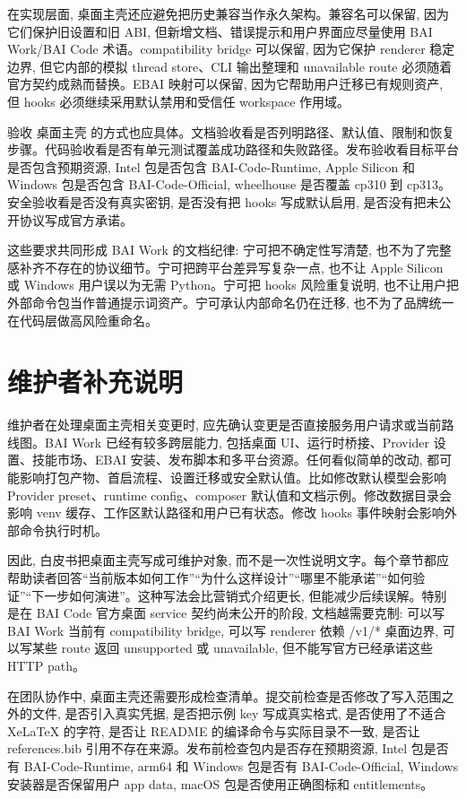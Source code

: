 在实现层面, 桌面主壳还应避免把历史兼容当作永久架构。兼容名可以保留, 因为它们保护旧设置和旧 ABI, 但新增文档、错误提示和用户界面应尽量使用 BAI Work/BAI Code 术语。compatibility bridge 可以保留, 因为它保护 renderer 稳定边界, 但它内部的模拟 thread store、CLI 输出整理和 unavailable route 必须随着官方契约成熟而替换。EBAI 映射可以保留, 因为它帮助用户迁移已有规则资产, 但 hooks 必须继续采用默认禁用和受信任 workspace 作用域。

验收 桌面主壳 的方式也应具体。文档验收看是否列明路径、默认值、限制和恢复步骤。代码验收看是否有单元测试覆盖成功路径和失败路径。发布验收看目标平台是否包含预期资源, Intel 包是否包含 BAI-Code-Runtime, Apple Silicon 和 Windows 包是否包含 BAI-Code-Official, wheelhouse 是否覆盖 cp310 到 cp313。安全验收看是否没有真实密钥, 是否没有把 hooks 写成默认启用, 是否没有把未公开协议写成官方承诺。

这些要求共同形成 BAI Work 的文档纪律: 宁可把不确定性写清楚, 也不为了完整感补齐不存在的协议细节。宁可把跨平台差异写复杂一点, 也不让 Apple Silicon 或 Windows 用户误以为无需 Python。宁可把 hooks 风险重复说明, 也不让用户把外部命令包当作普通提示词资产。宁可承认内部命名仍在迁移, 也不为了品牌统一在代码层做高风险重命名。

\section{维护者补充说明}

维护者在处理桌面主壳相关变更时, 应先确认变更是否直接服务用户请求或当前路线图。BAI Work 已经有较多跨层能力, 包括桌面 UI、运行时桥接、Provider 设置、技能市场、EBAI 安装、发布脚本和多平台资源。任何看似简单的改动, 都可能影响打包产物、首启流程、设置迁移或安全默认值。比如修改默认模型会影响 Provider preset、runtime config、composer 默认值和文档示例。修改数据目录会影响 venv 缓存、工作区默认路径和用户已有状态。修改 hooks 事件映射会影响外部命令执行时机。

因此, 白皮书把桌面主壳写成可维护对象, 而不是一次性说明文字。每个章节都应帮助读者回答“当前版本如何工作”“为什么这样设计”“哪里不能承诺”“如何验证”“下一步如何演进”。这种写法会比营销式介绍更长, 但能减少后续误解。特别是在 BAI Code 官方桌面 service 契约尚未公开的阶段, 文档越需要克制: 可以写 BAI Work 当前有 compatibility bridge, 可以写 renderer 依赖 /v1/* 桌面边界, 可以写某些 route 返回 unsupported 或 unavailable, 但不能写官方已经承诺这些 HTTP path。

在团队协作中, 桌面主壳还需要形成检查清单。提交前检查是否修改了写入范围之外的文件, 是否引入真实凭据, 是否把示例 key 写成真实格式, 是否使用了不适合 XeLaTeX 的字符, 是否让 README 的编译命令与实际目录不一致, 是否让 references.bib 引用不存在来源。发布前检查包内是否存在预期资源, Intel 包是否有 BAI-Code-Runtime, arm64 和 Windows 包是否有 BAI-Code-Official, Windows 安装器是否保留用户 app data, macOS 包是否使用正确图标和 entitlements。

